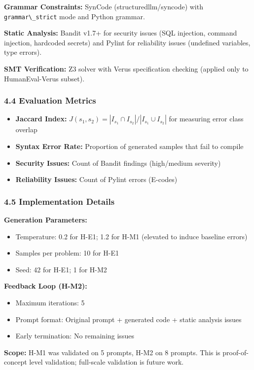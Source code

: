 \textbf{Grammar Constraints:} SynCode (structuredllm/syncode) with \texttt{grammar\textbackslash \_strict} mode and Python grammar.

\textbf{Static Analysis:} Bandit v1.7+ for security issues (SQL injection, command injection, hardcoded secrets) and Pylint for reliability issues (undefined variables, type errors).

\textbf{SMT Verification:} Z3 solver with Verus specification checking (applied only to HumanEval-Verus subset).

\subsubsection{4.4 Evaluation Metrics}

\begin{itemize}
\item \textbf{Jaccard Index:} $J(s_1, s_2) = |I_{s_1} \cap I_{s_2}| / |I_{s_1} \cup I_{s_2}|$ for measuring error class overlap
\item \textbf{Syntax Error Rate:} Proportion of generated samples that fail to compile
\item \textbf{Security Issues:} Count of Bandit findings (high/medium severity)
\item \textbf{Reliability Issues:} Count of Pylint errors (E-codes)
\end{itemize}

\subsubsection{4.5 Implementation Details}

\textbf{Generation Parameters:}
\begin{itemize}
\item Temperature: 0.2 for H-E1; 1.2 for H-M1 (elevated to induce baseline errors)
\item Samples per problem: 10 for H-E1
\item Seed: 42 for H-E1; 1 for H-M2
\end{itemize}

\textbf{Feedback Loop (H-M2):}
\begin{itemize}
\item Maximum iterations: 5
\item Prompt format: Original prompt + generated code + static analysis issues
\item Early termination: No remaining issues
\end{itemize}

\textbf{Scope:} H-M1 was validated on 5 prompts, H-M2 on 8 prompts. This is proof-of-concept level validation; full-scale validation is future work.
